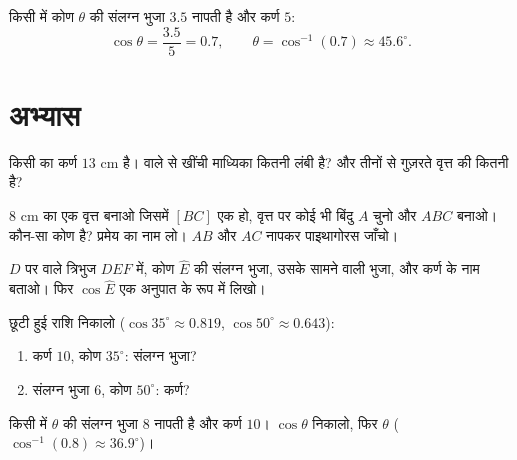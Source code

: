 \begin{example}[कोई कोण निकालना]\label{ex:g8:cosine:angle}
किसी  में कोण $\theta$ की संलग्न भुजा $3.5$ नापती है
और कर्ण $5$:
\[
\cos\theta = \frac{3.5}{5} = 0.7,
\qquad
\theta = \cos^{-1}(0.7) \approx 45.6^\circ .
\]
\end{example}

\section{अभ्यास}

\begin{exercise}[$\star$]\label{exo:g8:cosine:1}
किसी  का कर्ण $13$ cm है।  वाले  से खींची
माध्यिका कितनी लंबी है? और तीनों  से गुज़रते वृत्त की
 कितनी है?
\end{exercise}

\begin{exercise}[$\star$]\label{exo:g8:cosine:2}
$8$ cm  का एक वृत्त बनाओ जिसमें $[BC]$ एक  हो, वृत्त पर
कोई भी बिंदु $A$ चुनो और $ABC$ बनाओ। कौन-सा कोण  है? प्रमेय का
नाम लो। $AB$ और $AC$ नापकर पाइथागोरस जाँचो।
\end{exercise}

\begin{exercise}[$\star$]\label{exo:g8:cosine:3}
$D$ पर  वाले त्रिभुज $DEF$ में, कोण $\widehat E$ की संलग्न
भुजा, उसके सामने वाली भुजा, और कर्ण के नाम बताओ। फिर
$\cos \widehat E$ एक अनुपात के रूप में लिखो।
\end{exercise}

\begin{exercise}[$\star$]\label{exo:g8:cosine:4}
छूटी हुई राशि निकालो ($\cos 35^\circ \approx 0.819$,
$\cos 50^\circ \approx 0.643$):
\begin{enumerate}
  \item कर्ण $10$, कोण $35^\circ$: संलग्न भुजा?
  \item संलग्न भुजा $6$, कोण $50^\circ$: कर्ण?
\end{enumerate}
\end{exercise}

\begin{exercise}[$\star$]\label{exo:g8:cosine:5}
किसी  में $\theta$ की संलग्न भुजा $8$ नापती है और कर्ण
$10$। $\cos\theta$ निकालो, फिर $\theta$
($\cos^{-1}(0.8) \approx 36.9^\circ$)।
\end{exercise}

